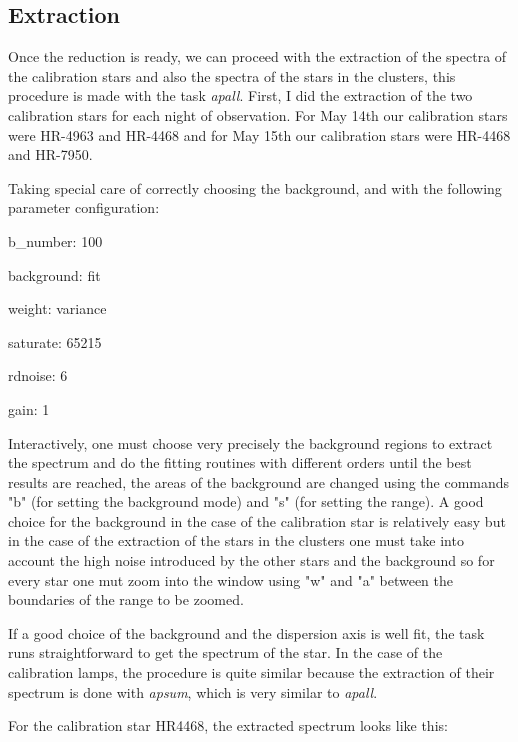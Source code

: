 \subsection{Extraction}

Once the reduction is ready, we can proceed with the extraction of the spectra of the calibration stars and also the spectra of the stars in the clusters, this procedure is made with the task \textit{apall}. First, I did the extraction of the two calibration stars for each night of observation. For May 14th our calibration stars were HR-4963 and HR-4468 and for May 15th our calibration stars were HR-4468 and HR-7950.

Taking special care of correctly choosing the background, and with the following parameter configuration:

b\_number: 100

background: fit

weight: variance

saturate: 65215

rdnoise: 6

gain: 1

Interactively, one must choose very precisely the background regions to extract the spectrum and do the fitting routines with different orders until the best results are reached, the areas of the background are changed using the commands "b" (for setting the background mode) and "s" (for setting the range). A good choice for the background in the case of the calibration star is relatively easy but in the case of the extraction of the stars in the clusters one must take into account the high noise introduced by the other stars and the background so for every star one mut zoom into the window using "w" and "a" between the boundaries of the range to be zoomed.

If a good choice of the background and the dispersion axis is well fit, the task runs straightforward to get the spectrum of the star. In the case of the calibration lamps, the procedure is quite similar because the extraction of their spectrum is done with \textit{apsum}, which is very similar to \textit{apall}. 

For the calibration star HR4468, the extracted spectrum looks like this:

